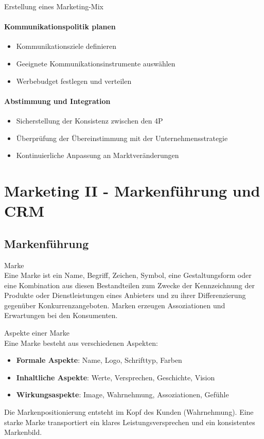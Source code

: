 \begin{KR}{Erstellung eines Marketing-Mix}
\paragraph{Kommunikationspolitik planen}
\begin{itemize}
    \item Kommunikationsziele definieren
    \item Geeignete Kommunikationsinstrumente auswählen
    \item Werbebudget festlegen und verteilen
\end{itemize}

\paragraph{Abstimmung und Integration}
\begin{itemize}
    \item Sicherstellung der Konsistenz zwischen den 4P
    \item Überprüfung der Übereinstimmung mit der Unternehmensstrategie
    \item Kontinuierliche Anpassung an Marktveränderungen
\end{itemize}
\end{KR}

\raggedcolumns

\section{Marketing II - Markenführung und CRM}

\subsection{Markenführung}

\begin{definition}{Marke}\\
Eine Marke ist ein Name, Begriff, Zeichen, Symbol, eine Gestaltungsform oder eine Kombination aus diesen Bestandteilen zum Zwecke der Kennzeichnung der Produkte oder Dienstleistungen eines Anbieters und zu ihrer Differenzierung gegenüber Konkurrenzangeboten. Marken erzeugen Assoziationen und Erwartungen bei den Konsumenten.
\end{definition}

\begin{concept}{Aspekte einer Marke}\\
Eine Marke besteht aus verschiedenen Aspekten:
\begin{itemize}
    \item \textbf{Formale Aspekte}: Name, Logo, Schrifttyp, Farben
    \item \textbf{Inhaltliche Aspekte}: Werte, Versprechen, Geschichte, Vision
    \item \textbf{Wirkungsaspekte}: Image, Wahrnehmung, Assoziationen, Gefühle
\end{itemize}

Die Markenpositionierung entsteht im Kopf des Kunden (Wahrnehmung). Eine starke Marke transportiert ein klares Leistungsversprechen und ein konsistentes Markenbild.
\end{concept}

